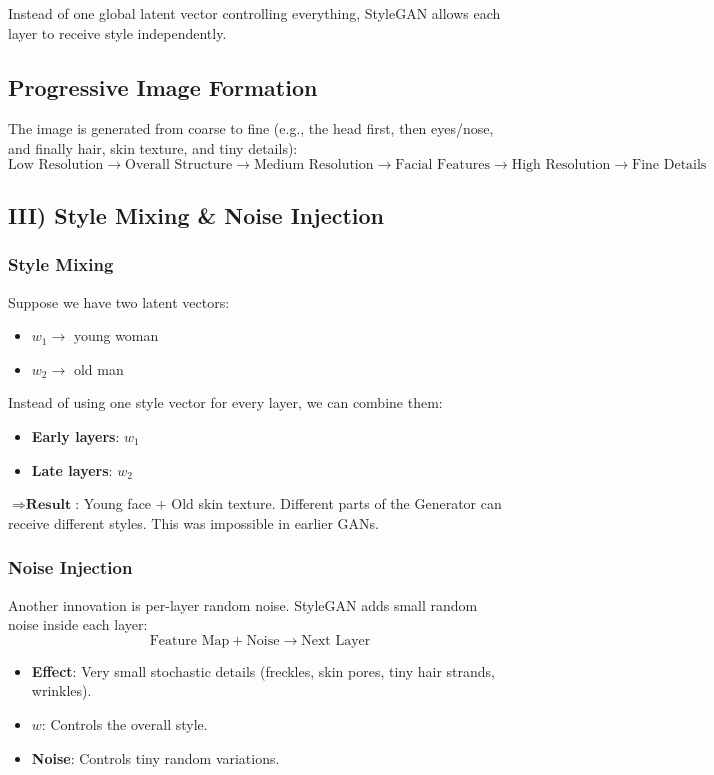 Instead of one global latent vector controlling everything, StyleGAN allows each layer to receive style independently.

\subsection*{Progressive Image Formation}

The image is generated from coarse to fine (e.g., the head first, then eyes/nose, and finally hair, skin texture, and tiny details):
\[
\text{Low Resolution} \longrightarrow \text{Overall Structure} \longrightarrow \text{Medium Resolution} \longrightarrow \text{Facial Features} \longrightarrow \text{High Resolution} \longrightarrow \text{Fine Details}
\]

\subsection*{III) Style Mixing \& Noise Injection}

\subsubsection*{Style Mixing}

Suppose we have two latent vectors:
\begin{itemize}
    \item $w_1 \rightarrow$ young woman
    \item $w_2 \rightarrow$ old man
\end{itemize}
Instead of using one style vector for every layer, we can combine them:
\begin{itemize}
    \item \textbf{Early layers}: $w_1$
    \item \textbf{Late layers}: $w_2$
\end{itemize}
$\Rightarrow \textbf{Result}$: Young face $+$ Old skin texture. Different parts of the Generator can receive different styles. This was impossible in earlier GANs.

\subsubsection*{Noise Injection}

Another innovation is per-layer random noise. StyleGAN adds small random noise inside each layer:
\[
\text{Feature Map} + \text{Noise} \longrightarrow \text{Next Layer}
\]
\begin{itemize}
    \item \textbf{Effect}: Very small stochastic details (freckles, skin pores, tiny hair strands, wrinkles).
    \item \textbf{$w$}: Controls the overall style.
    \item \textbf{Noise}: Controls tiny random variations.
\end{itemize}

